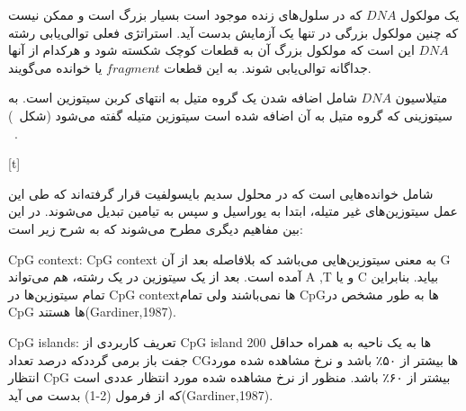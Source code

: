 
یک مولکول $DNA$ که در سلول‌های زنده موجود است بسیار بزرگ است و ممکن نیست که چنین مولکول بزرگی در تنها یک آزمایش بدست آید. استراتژی فعلی توالی‌یابی رشته $DNA$ این است که مولکول بزرگ آن به قطعات کوچک شکسته شود و هرکدام از آنها جداگانه توالی‌یابی شوند. به این قطعات $fragment$ یا خوانده می‌گویند.


متیلاسیون $DNA$ شامل اضافه شدن یک گروه متیل به انتهای کربن سیتوزین است. به سیتوزینی که گروه متیل به آن اضافه شده است سیتوزین متیله گفته می‌شود (شکل~)
~\cite{krueger2012dna}.

[t]



شامل خوانده‌هایی است که در محلول سدیم بایسولفیت قرار گرفته‌اند که طی این عمل سیتوزین‌های غیر متیله، ابتدا به یوراسیل و سپس به تیامین تبدیل می‌شوند. در این بین مفاهیم دیگری مطرح می‌شوند که به شرح زیر است:


 CpG context:
CpG context به معنی سیتوزین‌هایی می‌باشد که بلافاصله بعد از آن  G آمده است. بعد از یک سیتوزین در یک رشته، هم می‌تواند A ,T و یا C بیاید. بنابراین تمام سیتوزین‌ها در CpG contextها نمی‌باشند ولی تمام CpGها به طور مشخص در CpG ها هستند(Gardiner,1987).

 CpG islands:
تعریف کاربردی از CpG island ها به یک ناحیه به همراه حداقل 200 جفت باز برمی گرددکه درصد تعداد CGها بیشتر از ۵۰٪ باشد و نرخ مشاهده شده مورد انتظار CpG بیشتر از ۶۰٪ باشد. منظور از نرخ مشاهده شده مورد انتظار عددی است که از فرمول (2-1) بدست می آید(Gardiner,1987).



